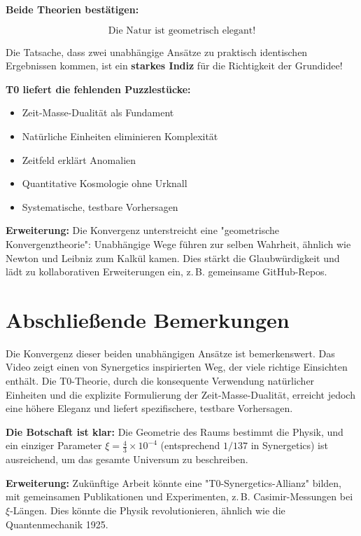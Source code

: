 \documentclass[12pt,a4paper]{article}
\newcommand{\xipar}{\xi}
\begin{document}
	\begin{gemeinsam}
		\textbf{Beide Theorien bestätigen:}
		
		\begin{equation}
			\boxed{\text{Die Natur ist geometrisch elegant!}}
		\end{equation}
		
		Die Tatsache, dass zwei unabhängige Ansätze zu praktisch identischen Ergebnissen kommen, ist ein \textbf{starkes Indiz} für die Richtigkeit der Grundidee!
		
		\textbf{T0 liefert die fehlenden Puzzlestücke:}
		\begin{itemize}
			\item Zeit-Masse-Dualität als Fundament
			\item Natürliche Einheiten eliminieren Komplexität
			\item Zeitfeld erklärt Anomalien
			\item Quantitative Kosmologie ohne Urknall
			\item Systematische, testbare Vorhersagen
		\end{itemize}
		
		\textbf{Erweiterung:} Die Konvergenz unterstreicht eine "geometrische Konvergenztheorie": Unabhängige Wege führen zur selben Wahrheit, ähnlich wie Newton und Leibniz zum Kalkül kamen. Dies stärkt die Glaubwürdigkeit und lädt zu kollaborativen Erweiterungen ein, z.\,B. gemeinsame GitHub-Repos.
	\end{gemeinsam}
	
	\section{Abschließende Bemerkungen}
	
	Die Konvergenz dieser beiden unabhängigen Ansätze ist bemerkenswert. Das Video zeigt einen von Synergetics inspirierten Weg, der viele richtige Einsichten enthält. Die T0-Theorie, durch die konsequente Verwendung natürlicher Einheiten und die explizite Formulierung der Zeit-Masse-Dualität, erreicht jedoch eine höhere Eleganz und liefert spezifischere, testbare Vorhersagen.
	
	\textbf{Die Botschaft ist klar:} Die Geometrie des Raums bestimmt die Physik, und ein einziger Parameter $\xipar = \frac{4}{3} \times 10^{-4}$ (entsprechend $1/137$ in Synergetics) ist ausreichend, um das gesamte Universum zu beschreiben.
	
	\textbf{Erweiterung:} Zukünftige Arbeit könnte eine "T0-Synergetics-Allianz" bilden, mit gemeinsamen Publikationen und Experimenten, z.\,B. Casimir-Messungen bei $\xipar$-Längen. Dies könnte die Physik revolutionieren, ähnlich wie die Quantenmechanik 1925.
	
\end{document}
